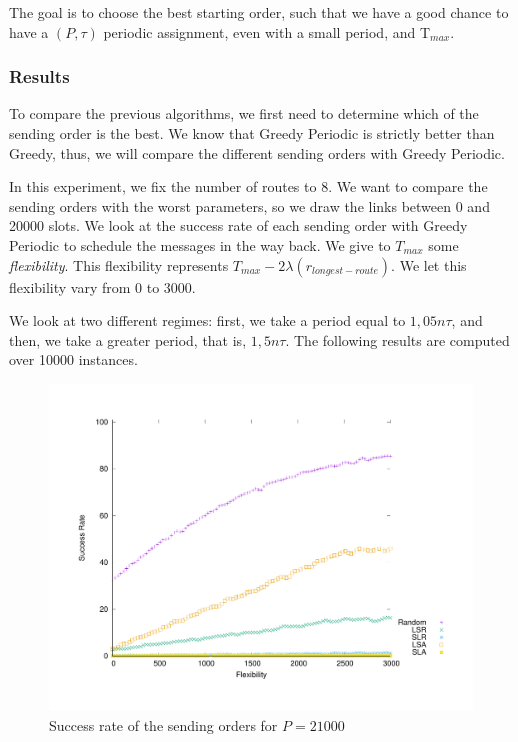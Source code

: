 \documentclass[a4paper,10pt]{article}
\begin{document}
     The goal is to choose the best starting order, such that we have a good chance to have a $(P,\tau)$ periodic assignment, even with a small period, and T$_{max}$.
    
    \subsubsection{Results}
    
    To compare the previous algorithms, we first need to determine which of the sending order is the best. We know that Greedy Periodic is strictly better than Greedy, thus, we will compare the different sending orders with Greedy Periodic.

   In this experiment, we fix the number of routes to 8. We want to compare the sending orders with the worst parameters, so we draw the links between 0 and 20000 slots. We look at the success rate of each sending order with Greedy Periodic to schedule the messages in the way back. We give to  $T_{max}$ some {\em flexibility}. This flexibility represents $T_{max} - 2\lambda(r_{longest-route})$. We let this flexibility vary from 0 to 3000.
   
   We look at two different regimes: first, we take a period equal to $1,05n\tau$, and then, we take a greater period, that is, $1,5n\tau$. The following results are computed over 10000 instances.
     
\begin{figure}

       \begin{center}
      \includegraphics[scale=0.4]{departs_gp_21000.pdf}
      \end{center}
      \caption{Success rate of the sending orders for $P = 21000$}
     \end{figure}
     
\end{document}
